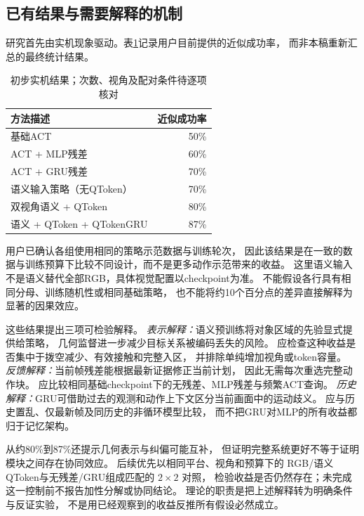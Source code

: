 \subsection{已有结果与需要解释的机制}
\label{sec:evidence}
研究首先由实机现象驱动。表\ref{tab:preliminary}记录用户目前提供的近似成功率，
而非本稿重新汇总的最终统计结果。
\begin{table}[t]
 \centering
 \caption{初步实机结果；次数、视角及配对条件待逐项核对}
 \label{tab:preliminary}
 \begin{tabular}{lr}
 \toprule
 方法描述 & 近似成功率\\
 \midrule
 基础ACT & 50\%\\
 ACT + MLP残差 & 60\%\\
 ACT + GRU残差 & 70\%\\
 语义输入策略（无QToken） & 70\%\\
 双视角语义 + QToken & 80\%\\
 语义 + QToken + QTokenGRU & 87\%\\
 \bottomrule
 \end{tabular}
\end{table}
用户已确认各组使用相同的策略示范数据与训练轮次，
因此该结果是在一致的数据与训练预算下比较不同设计，而不是更多动作示范带来的收益。
这里语义输入不是语义替代全部RGB，具体视觉配置以checkpoint为准。
不能假设各行具有相同分母、训练随机性或相同基础策略，
也不能将约10个百分点的差异直接解释为显著的因果效应。

这些结果提出三项可检验解释。
\emph{表示解释：}语义预训练将对象区域的先验显式提供给策略，
几何监督进一步减少目标关系被编码丢失的风险。
应检查这种收益是否集中于拨空减少、有效接触和完整入区，
并排除单纯增加视角或token容量。
\emph{反馈解释：}当前帧残差能根据最新证据修正当前计划，
因此无需每次重选完整动作块。
应比较相同基础checkpoint下的无残差、MLP残差与频繁ACT查询。
\emph{历史解释：}GRU可借助过去的观测和动作上下文区分当前画面中的运动歧义。
应与历史置乱、仅最新帧及同历史的非循环模型比较，
而不把GRU对MLP的所有收益都归于记忆架构。

从约80\%到87\%还提示几何表示与纠偏可能互补，
但证明完整系统更好不等于证明模块之间存在协同效应。
后续优先以相同平台、视角和预算下的
RGB/语义QToken与无残差/GRU组成匹配的 $2\times2$ 对照，
检验收益是否仍然存在；未完成这一控制前不报告加性分解或协同结论。
理论的职责是把上述解释转为明确条件与反证实验，
不是用已经观察到的收益反推所有假设必然成立。
